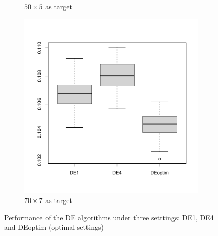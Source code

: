 \documentclass [PhD] {package/uclathes}
\begin{document}
\begin{figure}[!h]
\begin{subfigure}[b]{0.3\textwidth}
         \caption{$50\times 5$ as target}
     \end{subfigure}
     \hfill
     \begin{subfigure}[b]{0.3\textwidth}
         \centering
         \includegraphics[width=\textwidth]{chapters/DE/pdfs/boxplots4}
         \caption{$70\times 7$ as target}
     \end{subfigure}
        \caption{Performance of the DE algorithms under three setttings: DE1, DE4 and DEoptim (optimal settings)}
        \label{fig:three graphs}
\end{figure}
\end{document}
